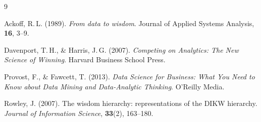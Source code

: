 \documentclass[12pt, a4paper]{article}
\begin{document}
\begin{thebibliography}{9}

  Ackoff, R.\,L. (1989).
  \textit{From data to wisdom}.
  Journal of Applied Systems Analysis, \textbf{16}, 3--9.

  Davenport, T.\,H., \& Harris, J.\,G. (2007).
  \textit{Competing on Analytics: The New Science of Winning}.
  Harvard Business School Press.

  Provost, F., \& Fawcett, T. (2013).
  \textit{Data Science for Business: What You Need to Know about
  Data Mining and Data-Analytic Thinking}.
  O'Reilly Media.

  Rowley, J. (2007).
  The wisdom hierarchy: representations of the DIKW hierarchy.
  \textit{Journal of Information Science}, \textbf{33}(2), 163--180.

\end{thebibliography}
\end{document}
